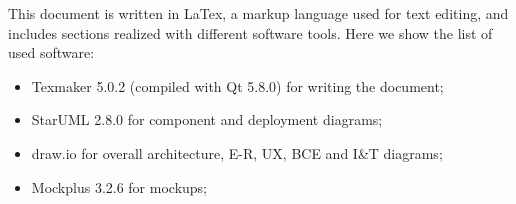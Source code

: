 This document is written in LaTex, a markup language used for text editing, and includes sections realized with different software tools. Here we show the list of used software:
\begin{itemize}
	\item Texmaker 5.0.2 (compiled with Qt 5.8.0) for writing the document;
	\item StarUML 2.8.0 for component and deployment diagrams;
	\item draw.io for overall architecture, E-R, UX, BCE and I\&T diagrams;
	\item Mockplus 3.2.6 for mockups;
\end{itemize}